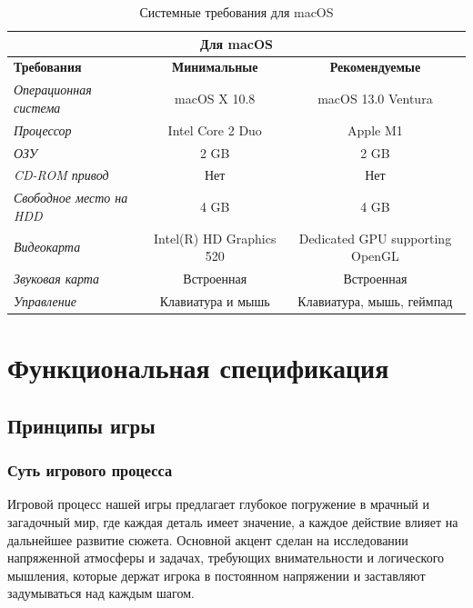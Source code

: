 \documentclass{article}
\begin{document}
	\begin{table}[h!]
		\centering
		\renewcommand{\arraystretch}{1.5}
		\setlength{\tabcolsep}{8pt}
		\begin{tabular}{|l|c|c|}
			\hline
			\multicolumn{3}{|c|}{\textbf{Для macOS}} \\ \hline
			\textbf{Требования} & \textbf{Минимальные} & \textbf{Рекомендуемые} \\ \hline
			\textit{Операционная система} & macOS X 10.8 & macOS 13.0 Ventura \\ \hline
			\textit{Процессор} &  Intel Core 2 Duo & Apple M1 \\ \hline
			\textit{ОЗУ} & 2 GB & 2 GB \\ \hline
			\textit{CD-ROM привод} & Нет & Нет \\ \hline
			\textit{Свободное место на HDD} & 4 GB & 4 GB \\ \hline
			\textit{Видеокарта} & Intel(R) HD Graphics 520 & Dedicated GPU supporting OpenGL \\ \hline
			\textit{Звуковая карта} & Встроенная & Встроенная \\ \hline
			\textit{Управление} & Клавиатура и мышь & Клавиатура, мышь, геймпад \\ \hline
		\end{tabular}
		\caption{Системные требования для macOS}
		\label{tab:system-requirements2}
	\end{table}
	
	\newpage
	\section{Функциональная спецификация}
	
	\subsection{Принципы игры}
	
	\subsubsection{Суть игрового процесса}
	
	Игровой процесс нашей игры предлагает глубокое погружение в мрачный и загадочный мир, где каждая деталь имеет значение, а каждое действие влияет на дальнейшее развитие сюжета. Основной акцент сделан на исследовании напряженной атмосферы и задачах, требующих внимательности и логического мышления, которые держат игрока в постоянном напряжении и заставляют задумываться над каждым шагом. \\
	
\end{document}
